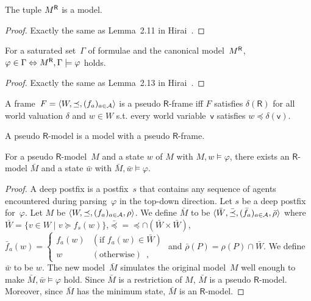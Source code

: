   \begin{proposition}
   The tuple ${M}^{\mathsf R}$ is a model.
  \end{proposition}
  \begin{proof}
   Exactly the same as Lemma~2.11 in Hirai~\cite{hirailpar}.
  \end{proof}

  \begin{proposition}
   \label{X}
   For a saturated set~$\Gamma$ of formulae and the canonical model~${M}^{\mathsf R}$,
   $\varphi\in\Gamma\Leftrightarrow {M}^{\mathsf R},\Gamma\models\varphi$ holds.
  \end{proposition}
  \begin{proof}
   Exactly the same as Lemma~2.13 in Hirai~\cite{hirailpar}.
  \end{proof}

  \begin{definition}
   A frame~$F = \langle{W,\preceq, (f_a)_{a\in\mathcal A}}\rangle$
   is a pseudo $\mathsf R$-frame iff $F$ satisfies
   $\delta(\mathsf R)$ for all world valuation
   $\delta$ and $w\in W$ s.t.
   every world variable~$\mathsf v$ satisfies
   $w\preceq \delta(\mathsf v)$.
  \end{definition}
  A pseudo $\mathsf R$-model is a model with a pseudo $\mathsf R$-frame.

  \begin{proposition}
   \label{pseudo-real}
   For a pseudo $\mathsf R$-model~$M$ and a state $w$ of $M$ with
   $M,w\models\varphi$,
   there exists an $\mathsf R$-model $\bar M$ and a state $\bar w$
   with $\bar M,\bar w\models\varphi$.
  \end{proposition}
  \begin{proof}
   A deep postfix is a postfix~$s$ that contains any sequence of agents
   encountered during parsing~$\varphi$ in the top-down direction.
   Let $s$ be a deep postfix for~$\varphi$. Let $M$ be
   $\langle{W,\preceq,(f_a)_{a\in\mathcal A},\rho}\rangle$.
   We define $\bar M$ to be $\langle{\bar W,\bar\preceq,
   (\bar f_a)_{a\in\mathcal A},\bar \rho}\rangle$ where
   $\bar W=\{v\in W\mid v\succeq f_s(w)\}$,$\bar\preceq =
   \preceq\cap (\bar W\times\bar W)$,
   $\bar f_a(w)= \begin{cases}
		  f_a(w)&(\mbox{if }f_a(w)\in\bar W)\\
		  w&(\mbox{otherwise})\enspace,
		 \end{cases}$
   and $\bar \rho(P) =\rho(P)\cap\bar W$.
   We define $\bar w$ to be $w$.
   The new model~$\bar M$ simulates the original model~$M$ well enough
   to make $\bar M,\bar w\models\varphi$ hold.
   Since $\bar M$ is a restriction of $M$, $\bar M$ is a pseudo
   $\mathsf R$-model.
   Moreover, since $\bar M$ has the minimum state, $\bar M$ is an
   $\mathsf R$-model.
  \end{proof}

